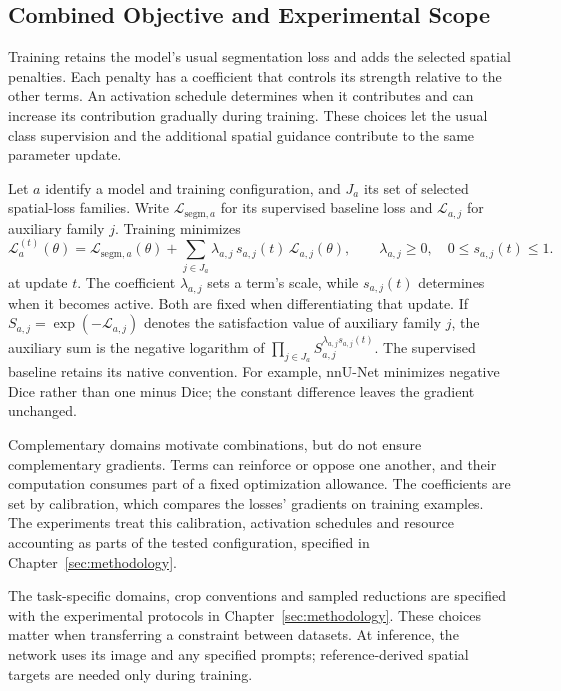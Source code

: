 \documentclass[12pt,a4paper]{article}
\begin{document}
\subsection{Combined Objective and Experimental Scope}
\label{sec:constraint-combination}

Training retains the model's usual segmentation loss and adds the selected
spatial penalties. Each penalty has a coefficient that controls its
strength relative to the other terms. An activation schedule determines
when it contributes and can increase its contribution gradually during
training. These choices let the usual class supervision and the additional
spatial guidance contribute to the same parameter update.

Let $a$ identify a model and training configuration, and $J_a$ its set
of selected spatial-loss families. Write $\mathcal L_{\mathrm{segm},a}$
for its supervised baseline loss and $\mathcal L_{a,j}$ for auxiliary
family $j$. Training minimizes
\begin{equation}
\mathcal{L}_{a}^{(t)}(\theta)
=\mathcal{L}_{\mathrm{segm},a}(\theta)
+\sum_{j\in J_a}\lambda_{a,j}\,s_{a,j}(t)\,
\mathcal{L}_{a,j}(\theta),
\qquad \lambda_{a,j}\geq0,\quad 0\leq s_{a,j}(t)\leq1.
\label{eq:scheduled-constraint-objective}
\end{equation}
at update $t$. The coefficient $\lambda_{a,j}$ sets a term's scale,
while $s_{a,j}(t)$ determines when it becomes active. Both are fixed
when differentiating that update. If
$S_{a,j}=\exp(-\mathcal L_{a,j})$ denotes the satisfaction value of
auxiliary family $j$, the auxiliary sum is the negative
logarithm of
$\prod_{j\in J_a}S_{a,j}^{\lambda_{a,j}s_{a,j}(t)}$.
The supervised baseline retains its native convention. For example,
nnU-Net minimizes negative Dice rather than one minus Dice; the constant
difference leaves the gradient unchanged.

Complementary domains motivate combinations, but do not ensure complementary
gradients. Terms can reinforce or oppose one another, and their computation
consumes part of a fixed optimization allowance. The coefficients are set by
calibration, which compares the losses' gradients on training examples. The
experiments treat this calibration, activation schedules and resource
accounting as parts of the tested configuration, specified in
Chapter~\ref{sec:methodology}.

The task-specific domains, crop conventions and sampled reductions
are specified with the experimental protocols in
Chapter~\ref{sec:methodology}. These choices matter when transferring a
constraint between datasets. At inference, the network uses its image
and any specified prompts; reference-derived spatial targets are needed
only during training.
\end{document}
